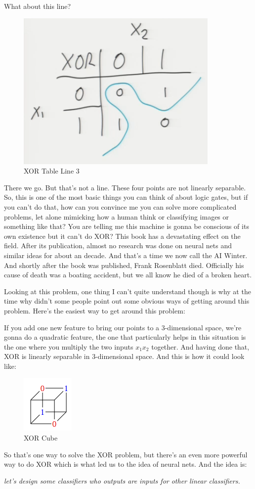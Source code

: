 \documentclass[fleqn,10pt]{olplainarticle}
\theoremstyle{definition}
\theoremstyle{remark}
\begin{document}
What about this line?
\begin{figure}[ht]
\centering
\includegraphics[width=0.25\linewidth]{images/XOR_3}
\caption{XOR Table Line 3}
\label{fig:XOR_Table_Line_3}
\end{figure}

There we go. But that's not a line. These four points are not linearly separable. So, this is one of the most basic things you can think of about logic gates, but if you can't do that, how can you convince me you can solve more complicated problems, let alone mimicking how a human think or classifying images or something like that? You are telling me this machine is gonna be conscious of its own existence but it can't do XOR? This book has a devastating effect on the field. After its publication, almost no research was done on neural nets and similar ideas for about an decade. And that's a time we now call the AI Winter. And shortly after the book was published, Frank Rosenblatt died. Officially his cause of death was a boating accident, but we all know he died of a broken heart.

Looking at this problem, one thing I can't quite understand though is why at the time why didn't some people point out some obvious ways of getting around this problem. Here's the easiest way to get around this problem: 

If you add one new feature to bring our points to a 3-dimensional space, we're gonna do a quadratic feature, the one that particularly helps in this situation is the one where you multiply the two inputs $x_1x_2$ together. And having done that, XOR is linearly separable in 3-dimensional space. And this is how it could look like:
\begin{figure}[ht]
\centering
\includegraphics[width=0.15\linewidth]{images/XOR_cube}
\caption{XOR Cube}
\label{fig:XOR_Cube}
\end{figure}

So that's one way to solve the XOR problem, but there's an even more powerful way to do XOR which is what led us to the idea of neural nets. And the idea is:
\begin{description}
\centering
\item[\textit{Idea:}]\textit{ let's design some classifiers who outputs are inputs for other linear classifiers.}
\end{description}
\vfill
\end{document}
